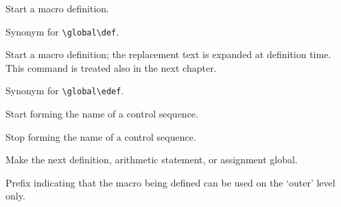 \documentclass[letterpaper]{book}
\begin{document}
\label{cschap:def}\label{cschap:gdef}\label{cschap:edef}\label{cschap:xdef}\label{cschap:csname}\label{cschap:endcsname}\label{cschap:global2}\label{cschap:outer}\label{cschap:long}\label{cschap:let}\label{cschap:futurelet}
\begin{inventory}
\item [\cs{def}] 
      Start a macro definition.

\item [\cs{gdef}] 
      Synonym for \verb-\global\def-.

\item [\cs{edef}] 
      Start a macro definition; 
      the replacement text is expanded at definition time.
      This command is treated also in the next chapter.

\item [\cs{xdef}] 
      Synonym for \verb-\global\edef-.

\item [\cs{csname}] 
      Start forming the name of a control sequence.

\item [\cs{endcsname}] 
      Stop forming the name of a control sequence.

\item [\cs{global}] 
      Make the next definition, arithmetic statement,
      or assignment global.

\item [\cs{outer}] 
      Prefix indicating that the macro being defined 
      can be used on the `outer' level only.


\end{inventory}
\end{document}
